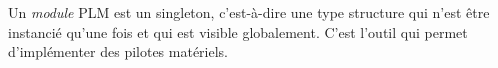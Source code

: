 





Un \emph{module} PLM est un singleton, c'est-à-dire une type structure qui n'est être instancié qu'une fois et qui est visible globalement. C'est l'outil qui permet d'implémenter des pilotes matériels.





